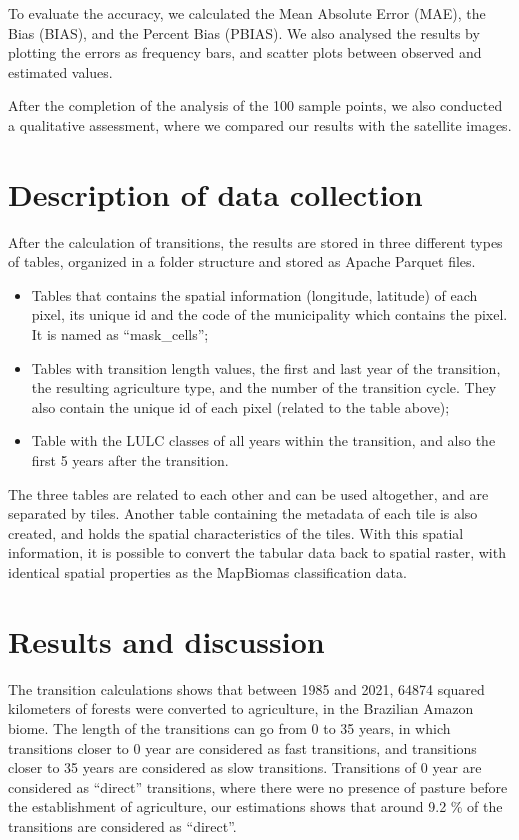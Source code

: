 \documentclass[essd, manuscript]{copernicus}
\begin{document}
To evaluate the accuracy, we calculated the Mean Absolute Error (MAE), the Bias (BIAS), and the Percent Bias (PBIAS).
We also analysed the results by plotting the errors as frequency bars, and scatter plots between observed and estimated values.

After the completion of the analysis of the 100 sample points, we also conducted a qualitative assessment, where we compared our results with the satellite images.

\section{Description of data collection}

After the calculation of transitions, the results are stored in three different types of tables, organized in a folder structure and stored as Apache Parquet files.

\begin{itemize}
\item
  Tables that contains the spatial information (longitude, latitude) of each pixel, its unique id and the code of the municipality which contains the pixel.
  It is named as ``mask\_cells'';
\item
  Tables with transition length values, the first and last year of the transition, the resulting agriculture type, and the number of the transition cycle.
  They also contain the unique id of each pixel (related to the table above);
\item
  Table with the LULC classes of all years within the transition, and also the first 5 years after the transition.
\end{itemize}

The three tables are related to each other and can be used altogether, and are separated by tiles.
Another table containing the metadata of each tile is also created, and holds the spatial characteristics of the tiles.
With this spatial information, it is possible to convert the tabular data back to spatial raster, with identical spatial properties as the MapBiomas classification data.

\section{Results and discussion}

The transition calculations shows that between 1985 and 2021, 64874 squared kilometers of forests were converted to agriculture, in the Brazilian Amazon biome.
The length of the transitions can go from 0 to 35 years, in which transitions closer to 0 year are considered as fast transitions, and transitions closer to 35 years are considered as slow transitions.
Transitions of 0 year are considered as ``direct'' transitions, where there were no presence of pasture before the establishment of agriculture, our estimations shows that around 9.2 \% of the transitions are considered as ``direct''.
\end{document}
